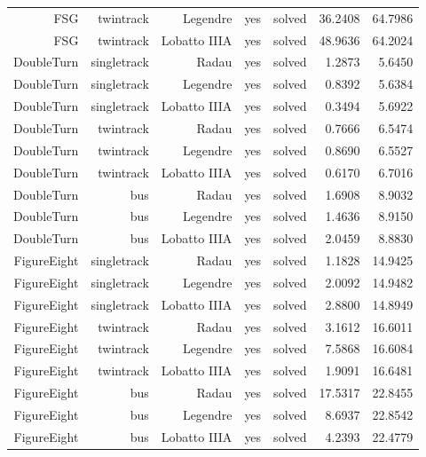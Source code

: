 {\begin{longtable}{|r|r|r|r|r|r|r|}
  FSG & twintrack & Legendre & yes & solved & 36.2408 & 64.7986 \\
  FSG & twintrack & Lobatto IIIA & yes & solved & 48.9636 & 64.2024 \\
  DoubleTurn & singletrack & Radau & yes & solved & 1.2873 & 5.6450 \\
  DoubleTurn & singletrack & Legendre & yes & solved & 0.8392 & 5.6384 \\
  DoubleTurn & singletrack & Lobatto IIIA & yes & solved & 0.3494 & 5.6922 \\
  DoubleTurn & twintrack & Radau & yes & solved & 0.7666 & 6.5474 \\
  DoubleTurn & twintrack & Legendre & yes & solved & 0.8690 & 6.5527 \\
  DoubleTurn & twintrack & Lobatto IIIA & yes & solved & 0.6170 & 6.7016 \\
  DoubleTurn & bus & Radau & yes & solved & 1.6908 & 8.9032 \\
  DoubleTurn & bus & Legendre & yes & solved & 1.4636 & 8.9150 \\
  DoubleTurn & bus & Lobatto IIIA & yes & solved & 2.0459 & 8.8830 \\
  FigureEight & singletrack & Radau & yes & solved & 1.1828 & 14.9425 \\
  FigureEight & singletrack & Legendre & yes & solved & 2.0092 & 14.9482 \\
  FigureEight & singletrack & Lobatto IIIA & yes & solved & 2.8800 & 14.8949 \\
  FigureEight & twintrack & Radau & yes & solved & 3.1612 & 16.6011 \\
  FigureEight & twintrack & Legendre & yes & solved & 7.5868 & 16.6084 \\
  FigureEight & twintrack & Lobatto IIIA & yes & solved & 1.9091 & 16.6481 \\
  FigureEight & bus & Radau & yes & solved & 17.5317 & 22.8455 \\
  FigureEight & bus & Legendre & yes & solved & 8.6937 & 22.8542 \\
  FigureEight & bus & Lobatto IIIA & yes & solved & 4.2393 & 22.4779 \\
  \hline
\end{longtable}
}
